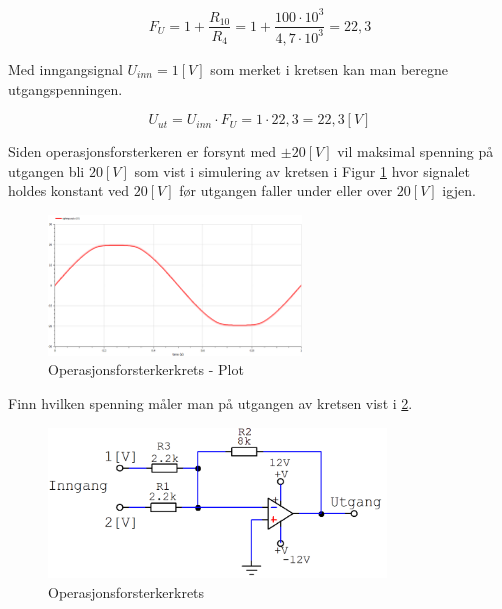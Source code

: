 \vspace{0.5cm} %

\begin{solution}[name=Løsningsforslag oppgave]
\[F_U= 1+\frac{R_{10}}{R_4} = 1+ \frac{100\cdot10^3}{4,7\cdot10^3} = 22,3 \]

Med inngangsignal $U_{inn}=1[V]$ som merket i kretsen kan man beregne utgangspenningen.

\[U_{ut}=U_{inn} \cdot F_U= 1 \cdot 22,3 = 22,3[V]\]

Siden operasjonsforsterkeren er forsynt med $\pm 20[V]$ vil maksimal spenning på utgangen bli $20[V]$ som vist i simulering av kretsen i Figur \ref{fig:NONinvKrets4PLOT} hvor signalet holdes konstant ved $20[V]$ før utgangen faller under eller over $20[V]$ igjen.
	\begin{figure}[H]
	\centering
	\includegraphics[width=0.6\textwidth]{operasjonsforsterker/plot/NONinvBasic4PLOT.png}
	\caption{Operasjonsforsterkerkrets - Plot}
	\label{fig:NONinvKrets4PLOT}
\end{figure}



\end{solution}
\vspace{0.5cm} %




\begin{question}[name=Oppgave, topic=operasjonsforsterker]
	Finn hvilken spenning måler man på utgangen av kretsen vist i \ref{fig:sumCircuit2}.

	\begin{figure}[H]
		\centering
		\includegraphics[width=0.8\textwidth]{operasjonsforsterker/figurer/SumKrets1.png}
		\caption{Operasjonsforsterkerkrets}
		\label{fig:sumCircuit2}
	\end{figure}

\end{question}


